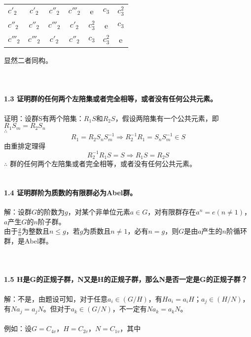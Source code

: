 \documentclass[12pt]{article}
\numberwithin{equation}{section}	 %
\begin{document}
\begin{spacing}{1.5}
\begin{center}
\begin{longtable}{l|cccccc}
	$c'_{2}$ & $c'_{2}$ & $c''_{2}$ & $c'''_{2}$ & e & $c_{3}$ & $c_{3}^{2}$ \\
	$c''_{2}$ & $c''_{2}$ & $c'''_{2}$ & $c'_{2}$ & $c_{3}^{2}$ & e & $c_{3}$ \\
	$c'''_{2}$ & $c'''_{2}$ & $c'_{2}$ & $c''_{2}$ & $c_{3}$ & $c_{3}^{2}$ & e \\
\end{longtable}
\end{center}
显然二者同构。\\
~\\
~\\
~\\
\textbf{1.3 \quad 证明群的任何两个左陪集或者完全相等，或者没有任何公共元素。}\\
~\\
证明：设群S有两个陪集：$R_{1}S$和$R_{2}S$，假设两陪集有一个公共元素，即$R_{1}S_{m}=R_{2}S_{n}$ \\
$\therefore$
\begin{equation}
R_{1} = R_{2}S_{n}S_{m}^{-1} \Longrightarrow R_{2}^{-1}R_{1} = S_{n}S_{m}^{-1} \in S
\end{equation}
由重排定理得
\begin{equation}
R_{2}^{-1}R_{1}S = S \Longrightarrow R_{1}S = R_{2}S
\end{equation}
$\therefore$ 群的任何两个左陪集或者完全相等，或者没有任何公共元素。
~\\
~\\
~\\
\textbf{1.4 \quad 证明群阶为质数的有限群必为Abel群。}\\
~\\
解：设群$G$的阶数为$g$，对某个非单位元素$a \in G$，对有限群存在$a^{n}=e(n \ne 1)$，$a$产生$G$的$n$阶子群。\\
由于$\displaystyle \frac{g}{n}$为整数且$n \le g$，若$g$为质数且$n \ne 1$，必有$n=g$，则$G$是由$a$产生的$n$阶循环群，是Abel群。\\
~\\
~\\
~\\
\textbf{1.5 \quad H是G的正规子群，N又是H的正规子群，那么N是否一定是G的正规子群？}\\
~\\
解：不是，由题设可知，对于任意$a_{i} \in (G/H)$，有$Ha_{i}=a_{i}H$；$a_{j} \in (H/N)$，有$Na_{j}=a_{j}N$。但对于$a_{k} \in (G/N)$，不一定有$Na_{k}=a_{k}N$。\\
~\\
例如：设$G=C_{4v}$，$H=C_{2v}$，$N=C_{1v}$，其中
\begin{equation}

\end{equation}
\end{spacing}
\end{document}
